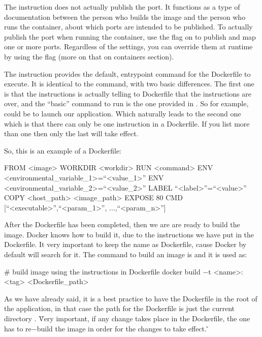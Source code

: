 The  instruction does not actually publish the port. It functions as a type of documentation between the
person who builds the image and the person who runs the container, about which ports are intended to be published. To
actually publish the port when running the container, use the  flag on  to publish and
map one or more ports. Regardless of the  settings, you can override them at runtime by using the
 flag (more on that on containers section).
\item The  instruction provides the default, entrypoint command for the Dockerfile to execute. It is
identical to the  command, with two basic differences. The first one is that the  instructions is
actually telling to Dockerfile that the instructions are over, and the ``basic'' command to run is the one provided
in . So for example,  could be to launch our application. Which naturally leads to the second one
which is that there can only be one  instruction in a Dockerfile. If you list more than one  then
only the last will take effect.
\eit

So, this is an example of a Dockerfile:

\begin{block}
FROM <image>
WORKDIR <workdir>
RUN <command>
ENV <environmental_variable_1>=``<value_1>''
ENV <environmental_variable_2>=``<value_2>''
LABEL ``<label>''=``<value>''
COPY <host_path> <image_path>
EXPOSE 80
CMD [``<executable>'',``<param_1>'', $\ldots$,``<param_n>'']
\end{block}

After the Dockerfile has been completed, then we are are ready to build the image. Docker knows how to build it, due
to the instructions we have put in the Dockerfile. It very important to keep the name as Dockerfile, cause Docker by
default will search for it. The command to build an image is  and it is used as:

\begin{bash}
# build image using the instructions in Dockerfile
docker build $-$t <name>:<tag> <Dockerfile_path>
\end{bash}

As we have already said, it is a best practice to have the Dockerfile in the root of the application, in that case
the path for the Dockerfile is just the current directory . \v

Very important, if any change takes place in the Dockerfile, the one has to re$-$build the image in order for the
changes to take effect. \v

